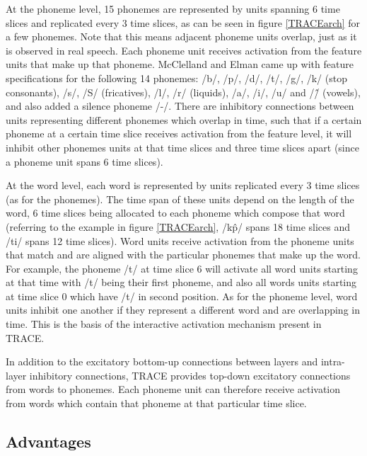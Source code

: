 At the phoneme level, 15 phonemes are represented by units spanning 6 time slices and replicated every 3 time slices, as can be seen in figure \ref{TRACEarch} for a few phonemes. Note that this means adjacent phoneme units overlap, just as it is observed in real speech. Each phoneme unit receives activation from the feature units that make up that phoneme. McClelland and Elman came up with feature specifications for the following 14 phonemes: /b/, /p/, /d/, /t/, /g/, /k/ (stop consonants), /s/, /S/ (fricatives), /l/, /r/ (liquids), /a/, /i/, /u/ and /\^/ (vowels), and also added a silence phoneme /-/. There are inhibitory connections between units representing different phonemes which overlap in time, such that if a certain phoneme at a certain time slice receives activation from the feature level, it will inhibit other phonemes units at that time slices and three time slices apart (since a phoneme unit spans 6 time slices).

At the word level, each word is represented by units replicated every 3 time slices (as for the phonemes). The time span of these units depend on the length of the word, 6 time slices being allocated to each phoneme which compose that word (referring to the example in figure \ref{TRACEarch}, /k\^p/ spans 18 time slices and /ti/ spans 12 time slices). Word units receive activation from the phoneme units that match and are aligned with the particular phonemes that make up the word. For example, the phoneme /t/ at time slice 6 will activate all word units starting at that time with /t/ being their first phoneme, and also all words units starting at time slice 0 which have /t/ in second position. As for the phoneme level, word units inhibit one another if they represent a different word and are overlapping in time. This is the basis of the interactive activation mechanism present in TRACE.

In addition to the excitatory bottom-up connections between layers and intra-layer inhibitory connections, TRACE provides top-down excitatory connections from words to phonemes. Each phoneme unit can therefore receive activation from words which contain that phoneme at that particular time slice.










\subsection{Advantages}

